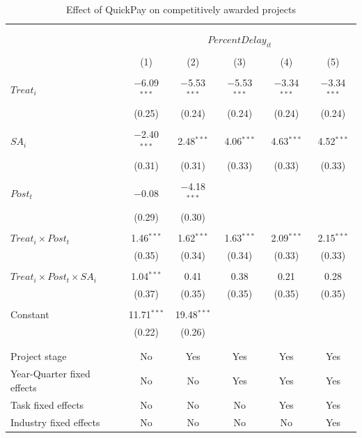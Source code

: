 \documentclass[
]{article}
\begin{document}
\begin{table}[H] \centering 
  \caption{Effect of QuickPay on competitively awarded projects} 
  \label{} 
\small 
\begin{tabular}{@{\extracolsep{-2pt}}lccccc} 
\\[-1.8ex]\hline 
\hline \\[-1.8ex] 
\\[-1.8ex] & \multicolumn{5}{c}{$PercentDelay_{it}$  } \\ 
\\[-1.8ex] & (1) & (2) & (3) & (4) & (5)\\ 
\hline \\[-1.8ex] 
 $Treat_i$ & $-$6.09$^{***}$ & $-$5.53$^{***}$ & $-$5.53$^{***}$ & $-$3.34$^{***}$ & $-$3.34$^{***}$ \\ 
  & (0.25) & (0.24) & (0.24) & (0.24) & (0.24) \\ 
  & & & & & \\ 
 $SA_i$ & $-$2.40$^{***}$ & 2.48$^{***}$ & 4.06$^{***}$ & 4.63$^{***}$ & 4.52$^{***}$ \\ 
  & (0.31) & (0.31) & (0.33) & (0.33) & (0.33) \\ 
  & & & & & \\ 
 $Post_t$ & $-$0.08 & $-$4.18$^{***}$ &  &  &  \\ 
  & (0.29) & (0.30) &  &  &  \\ 
  & & & & & \\ 
 $Treat_i \times Post_t$ & 1.46$^{***}$ & 1.62$^{***}$ & 1.63$^{***}$ & 2.09$^{***}$ & 2.15$^{***}$ \\ 
  & (0.35) & (0.34) & (0.34) & (0.33) & (0.33) \\ 
  & & & & & \\ 
 $Treat_i \times Post_t \times SA_i $ & 1.04$^{***}$ & 0.41 & 0.38 & 0.21 & 0.28 \\ 
  & (0.37) & (0.35) & (0.35) & (0.35) & (0.35) \\ 
  & & & & & \\ 
 Constant & 11.71$^{***}$ & 19.48$^{***}$ &  &  &  \\ 
  & (0.22) & (0.26) &  &  &  \\ 
  & & & & & \\ 
\hline \\[-1.8ex] 
Project stage & No & Yes & Yes & Yes & Yes \\ 
Year-Quarter fixed effects & No & No & Yes & Yes & Yes \\ 
Task fixed effects & No & No & No & Yes & Yes \\ 
Industry fixed effects & No & No & No & No & Yes \\ 

\end{tabular}
\end{table}
\end{document}

